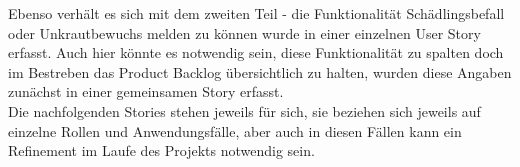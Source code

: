 Ebenso verhält es sich mit dem zweiten Teil - die Funktionalität Schädlingsbefall oder Unkrautbewuchs melden zu können wurde in einer einzelnen User Story erfasst. Auch hier könnte es notwendig sein, diese Funktionalität zu spalten doch im Bestreben das Product Backlog übersichtlich zu halten, wurden diese Angaben zunächst in einer gemeinsamen Story erfasst.\\

Die nachfolgenden Stories stehen jeweils für sich, sie beziehen sich jeweils auf einzelne Rollen und Anwendungsfälle, aber auch in diesen Fällen kann ein Refinement im Laufe des Projekts notwendig sein.
  
